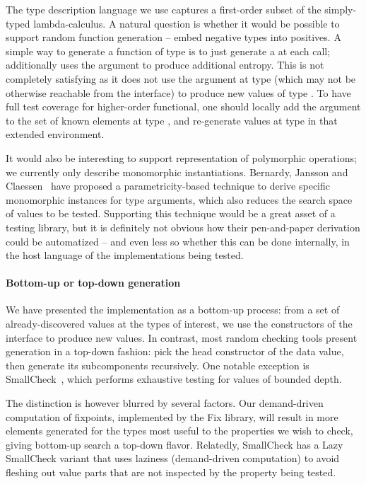 The type description language we use captures a first-order subset of
the simply-typed lambda-calculus. A natural question is whether it
would be possible to support random function generation -- embed
negative types into positives. A simple way to generate a function of
type  is to just generate a  at each call;
\qcheck additionally uses the  argument to produce additional
entropy. This is not completely satisfying as it does not use the
argument at type  (which may not be otherwise reachable from
the interface) to produce new values of type . To have full
test coverage for higher-order functional, one should locally add the
argument to the set of known elements at type , and
re-generate values at type  in that extended environment.

It would also be interesting to support representation of polymorphic
operations; we currently only describe monomorphic
instantiations. Bernardy, Jansson and
Claessen~\cite{DBLP:conf/esop/BernardyJC10} have proposed
a parametricity-based technique to derive specific monomorphic
instances for type arguments, which also reduces the search space of
values to be tested. Supporting this technique would be a great asset
of a testing library, but it is definitely not obvious how their
pen-and-paper derivation could be automatized -- and even less so
whether this can be done internally, in the host language of the
implementations being tested.

\paragraph{Bottom-up or top-down generation}

We have presented the  implementation as a bottom-up
process: from a set of already-discovered values at the types of
interest, we use the constructors of the interface to produce new
values. In contrast, most random checking tools present generation in
a top-down fashion: pick the head constructor of the data value, then
generate its subcomponents recursively. One notable exception is
SmallCheck~\cite{DBLP:conf/haskell/RuncimanNL08}, which performs
exhaustive testing for values of bounded depth.

The distinction is however blurred by several factors. Our
demand-driven computation of fixpoints, implemented by the Fix
library, will result in more elements generated for the types most
useful to the properties we wish to check, giving bottom-up search
a top-down flavor. Relatedly, SmallCheck has a Lazy SmallCheck variant
that uses laziness (demand-driven computation) to avoid fleshing out
value parts that are not inspected by the property being tested.


